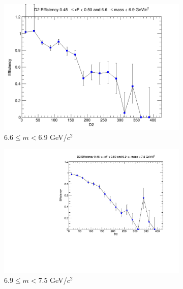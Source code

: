 \documentclass[11pt]{article}
\begin{document}
\begin{figure}[p]
\begin{subfigure}[b]{0.32\textwidth}
        \includegraphics[width=\textwidth]{./kTrackerEfficiencyPlots/D2_Efficiency_xF9_mass8.png}
        \caption{$6.6 \leq m < 6.9$ GeV/$c^2$}
    \end{subfigure}\vspace{0.5cm}
    \begin{subfigure}[b]{0.32\textwidth}
        \centering
        \includegraphics[width=\textwidth]{./kTrackerEfficiencyPlots/D2_Efficiency_xF9_mass9.pdf}
        \caption{$6.9 \leq m < 7.5$ GeV/$c^2$}
    \end{subfigure}\hfill
    \begin{subfigure}[b]{0.32\textwidth}
        \centering

\end{subfigure}
\end{figure}
\end{document}

